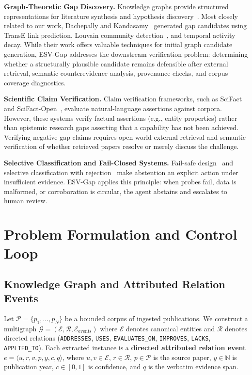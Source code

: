 \documentclass[runningheads]{llncs}
\newcommand{\method}{ESV-Gap}
\begin{document}
\noindent\textbf{Graph-Theoretic Gap Discovery.} Knowledge graphs provide structured representations for literature synthesis and hypothesis discovery~\cite{swanson1986fish,schneider2022decade,chen2019ukge}. Most closely related to our work, Dachepally and Kandasamy~\cite{rahul2026dynamic} generated gap candidates using TransE link prediction, Louvain community detection~\cite{blondel2008fast}, and temporal activity decay. While their work offers valuable techniques for initial graph candidate generation, \method{} addresses the downstream verification problem: determining whether a structurally plausible candidate remains defensible after external retrieval, semantic counterevidence analysis, provenance checks, and corpus-coverage diagnostics.

\noindent\textbf{Scientific Claim Verification.} Claim verification frameworks, such as SciFact~\cite{wadden2020scifact} and SciFact-Open~\cite{wadden2022scifactopen}, evaluate natural-language assertions against corpora. However, these systems verify factual assertions (e.g., entity properties) rather than epistemic research gaps asserting that a capability has not been achieved. Verifying negative gap claims requires open-world external retrieval and semantic verification of whether retrieved papers resolve or merely discuss the challenge.

\noindent\textbf{Selective Classification and Fail-Closed Systems.} Fail-safe design~\cite{saltzer1975protection,shneiderman2020hcai} and selective classification with rejection~\cite{cortes2016learning,geifman2017selective} make abstention an explicit action under insufficient evidence. \method{} applies this principle: when probes fail, data is malformed, or corroboration is circular, the agent abstains and escalates to human review.

\section{Problem Formulation and Control Loop}
\label{sec:problem}

\subsection{Knowledge Graph and Attributed Relation Events}
Let $\mathcal{P} = \{p_1, \dots, p_N\}$ be a bounded corpus of ingested publications. We construct a multigraph $\mathcal{G} = (\mathcal{E}, \mathcal{R}, \mathcal{E}_{\text{events}})$ where $\mathcal{E}$ denotes canonical entities and $\mathcal{R}$ denotes directed relations (\texttt{ADDRESSES}, \texttt{USES}, \texttt{EVALUATES\_ON}, \texttt{IMPROVES}, \texttt{LACKS}, \texttt{APPLIED\_\allowbreak TO}). Each extracted instance is a \textbf{directed attributed relation event} $e = \langle u, r, v, p, y, c, q \rangle$, where $u, v \in \mathcal{E}$, $r \in \mathcal{R}$, $p \in \mathcal{P}$ is the source paper, $y \in \mathbb{N}$ is publication year, $c \in [0, 1]$ is confidence, and $q$ is the verbatim evidence span.
\end{document}
